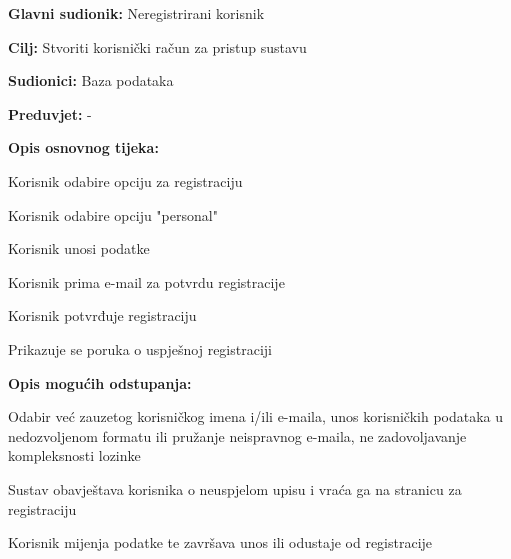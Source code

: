 					\noindent {}
					\begin{packed_item}
	
						\item \textbf{Glavni sudionik: }Neregistrirani korisnik
						\item  \textbf{Cilj:} Stvoriti korisnički račun za pristup sustavu
						\item  \textbf{Sudionici:} Baza podataka
						\item  \textbf{Preduvjet:} -
						\item  \textbf{Opis osnovnog tijeka:}
						
						\item[] \begin{packed_enum}
	
							\item Korisnik odabire opciju za registraciju
							\item Korisnik odabire opciju "personal"
							\item Korisnik unosi podatke
							\item Korisnik prima e-mail za potvrdu registracije
							\item Korisnik potvrđuje registraciju
							\item Prikazuje se poruka o uspješnoj registraciji

						\end{packed_enum}
						
						\item  \textbf{Opis mogućih odstupanja:}
						
						\item[] \begin{packed_item}
	
							\item[2.a] Odabir već zauzetog korisničkog imena i/ili e-maila, unos korisničkih podataka u nedozvoljenom formatu ili pružanje neispravnog e-maila, ne zadovoljavanje kompleksnosti lozinke
							\item[] \begin{packed_enum}
								
								\item Sustav obavještava korisnika o neuspjelom upisu i vraća ga na stranicu za registraciju
								\item Korisnik mijenja podatke te završava unos ili odustaje od registracije
								
							\end{packed_enum}
							
						\end{packed_item}
					\end{packed_item}
					
